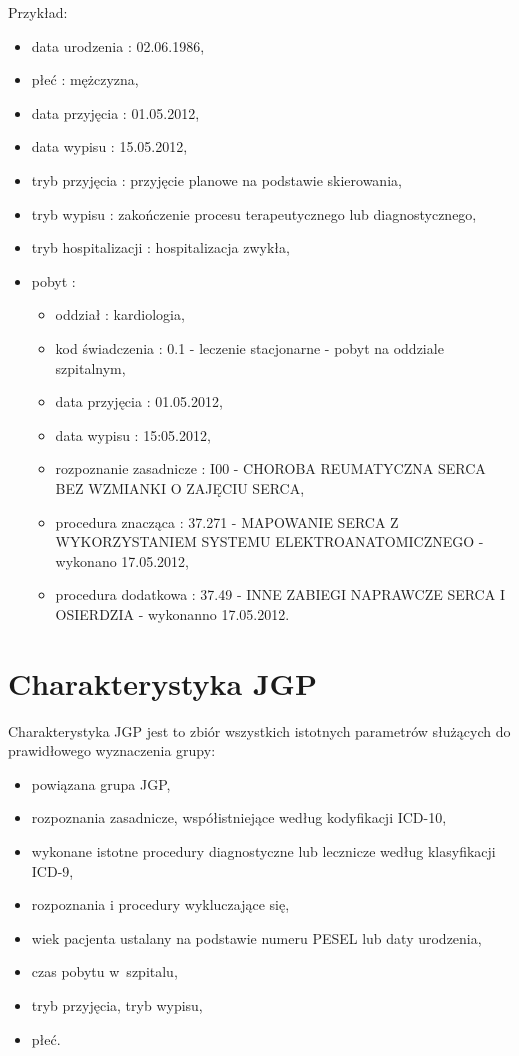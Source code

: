 Przykład:
\begin{itemize}
\item data urodzenia	: 02.06.1986,
\item płeć		: mężczyzna,
\item data przyjęcia	: 01.05.2012,
\item data wypisu	: 15.05.2012,
\item tryb przyjęcia	: przyjęcie planowe na podstawie skierowania,
\item tryb wypisu	: zakończenie procesu terapeutycznego lub diagnostycznego,
\item tryb hospitalizacji : hospitalizacja zwykła,
\item pobyt		:
 \begin{itemize}
 \item oddział		: kardiologia,
 \item kod świadczenia	: 0.1 - leczenie stacjonarne - pobyt na oddziale szpitalnym,
 \item data przyjęcia	: 01.05.2012,
 \item data wypisu	: 15:05.2012,
 \item rozpoznanie zasadnicze	: I00 - CHOROBA REUMATYCZNA SERCA BEZ WZMIANKI O ZAJĘCIU SERCA,
 \item procedura znacząca	: 37.271 - MAPOWANIE SERCA Z WYKORZYSTANIEM SYSTEMU ELEKTROANATOMICZNEGO - wykonano 17.05.2012,
 \item procedura dodatkowa	: 37.49 - INNE ZABIEGI NAPRAWCZE SERCA I OSIERDZIA - wykonanno 17.05.2012.
 \end{itemize}
\end{itemize}


\section{Charakterystyka JGP}
\label{sec:charakterystykaJGP}

Charakterystyka JGP jest to zbiór wszystkich istotnych parametrów służących do prawidłowego wyznaczenia grupy\cite{algorytm_grupera}:
\begin{itemize}
\item powiązana grupa JGP,
\item rozpoznania zasadnicze, współistniejące według kodyfikacji ICD-10,
\item wykonane istotne procedury diagnostyczne lub lecznicze według klasyfikacji ICD-9,
\item rozpoznania i procedury wykluczające się,
\item wiek pacjenta ustalany na podstawie numeru PESEL lub daty urodzenia,
\item czas pobytu w~szpitalu,
\item tryb przyjęcia, tryb wypisu,
\item płeć.
\end{itemize}

